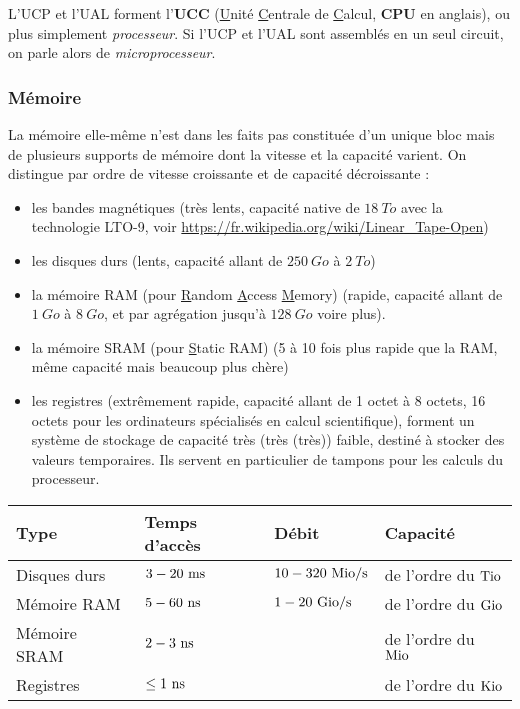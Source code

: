 \documentclass[../../main.tex]{subfiles}
\begin{document}
L'UCP et l'UAL forment l'\textbf{UCC} (\underline{U}nité \underline{C}entrale de \underline{C}alcul, \textbf{CPU} en anglais), ou plus simplement \textit{processeur}. Si l'UCP et l'UAL sont assemblés en un seul circuit, on parle alors de \textit{microprocesseur}.


\subsubsection{Mémoire}
\label{ssub:m_moire}
La mémoire elle-même n'est dans les faits pas constituée d'un unique bloc mais de plusieurs supports de mémoire dont la vitesse et la capacité varient. On distingue par ordre de vitesse croissante et de capacité décroissante :
\begin{itemize}
    \item les bandes magnétiques (très lents, capacité native de $18\ To$ avec la technologie LTO-9, voir \url{https://fr.wikipedia.org/wiki/Linear_Tape-Open})
    \item les disques durs (lents, capacité allant de $250\ Go$ à $2\ To$)
    \item la mémoire RAM (pour \underline{R}andom \underline{A}ccess \underline{M}emory) (rapide, capacité allant de $1\ Go$ à $8\ Go$, et par agrégation jusqu'à $128\ Go$ voire plus).
    \item la mémoire SRAM  (pour \underline{S}tatic RAM) (5 à 10 fois plus rapide que la RAM, même capacité mais beaucoup plus chère)
    \item les registres (extrêmement rapide, capacité allant de 1 octet à 8 octets, 16 octets pour les ordinateurs spécialisés en calcul scientifique), forment un système de stockage de capacité très (très (très)) faible, destiné à stocker des valeurs temporaires. Ils servent en particulier de tampons pour les calculs du processeur.
\end{itemize}
\begin{center}
\begin{tabular}{|l|l|l|l|}
\hline
\textbf{Type} & \textbf{Temps d'accès} & \textbf{Débit} & \textbf{Capacité} \\
\hline
Disques durs & $3 - 20\ \rm{ms}$ & $10 - 320\ \rm{Mio/s}$ & de l'ordre du $\rm{Tio}$ \\
Mémoire RAM & $5 - 60\ \rm{ns}$ & $1 - 20\ \rm{Gio/s}$ & de l'ordre du $\rm{Gio}$ \\
Mémoire SRAM & $2 - 3\ \rm{ns}$ & & de l'ordre du $\rm{Mio}$ \\
Registres & $\leq 1\ \rm{ns}$ & & de l'ordre du $\rm{Kio}$ \\
\hline
\end{tabular}
\end{center}
\end{document}
